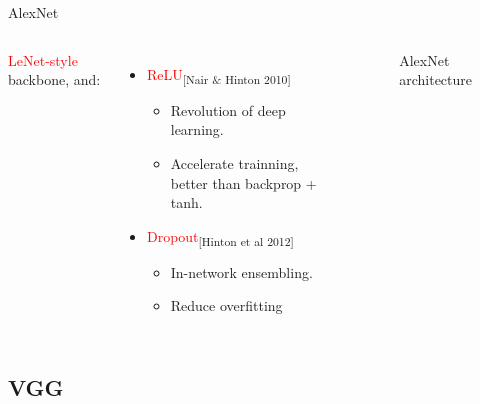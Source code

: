 \documentclass[aspectratio=169]{beamer}
\begin{document}
\begin{frame}{AlexNet}
  \begin{columns}[T,c,onlytextwidth]
    \textcolor{red}{LeNet-style} backbone, and:
    \begin{itemize}
        \item \textcolor{red}{ReLU}\textsubscript{[Nair \& Hinton 2010]}
        \begin{itemize}
            \item Revolution of deep learning.
            \item Accelerate trainning, better than backprop + tanh.
        \end{itemize}
        \item \textcolor{red}{Dropout}\textsubscript{[Hinton et al 2012]}
        \begin{itemize}
            \item In-network ensembling.
            \item Reduce overfitting
        \end{itemize}
    \end{itemize}
\begin{figure}
\caption{AlexNet architecture}
\label{fig:alexnet}
\end{figure}
  \end{columns}

\end{frame}

\subsection{VGG}
\end{document}
